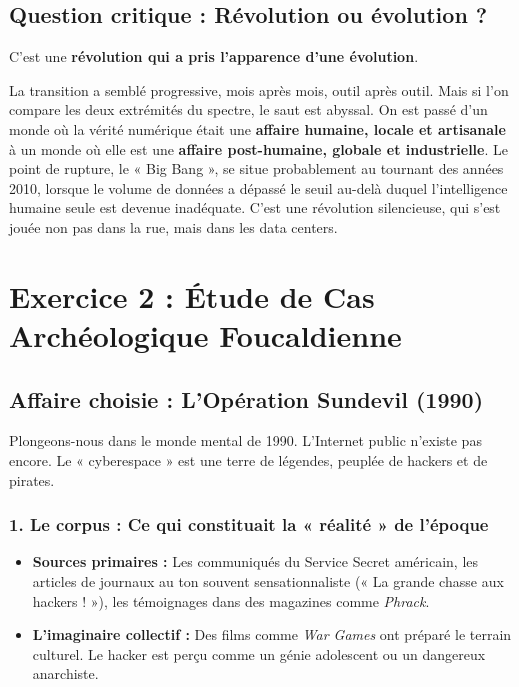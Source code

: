 \documentclass[12pt]{article}
\begin{document}
\subsection{Question critique : Révolution ou évolution ?}

C'est une \textbf{révolution qui a pris l'apparence d'une évolution}.

La transition a semblé progressive, mois après mois, outil après outil. Mais si l'on compare les deux extrémités du spectre, le saut est abyssal. On est passé d'un monde où la vérité numérique était une \textbf{affaire humaine, locale et artisanale} à un monde où elle est une \textbf{affaire post-humaine, globale et industrielle}. Le point de rupture, le « Big Bang », se situe probablement au tournant des années 2010, lorsque le volume de données a dépassé le seuil au-delà duquel l'intelligence humaine seule est devenue inadéquate. C'est une révolution silencieuse, qui s'est jouée non pas dans la rue, mais dans les data centers.

\section*{Exercice 2 : Étude de Cas Archéologique Foucaldienne}

\subsection{Affaire choisie : L'Opération Sundevil (1990)}

Plongeons-nous dans le monde mental de 1990. L'Internet public n'existe pas encore. Le « cyberespace » est une terre de légendes, peuplée de hackers et de pirates.

\subsubsection{1. Le corpus : Ce qui constituait la « réalité » de l'époque}

\begin{itemize}
\item \textbf{Sources primaires :} Les communiqués du Service Secret américain, les articles de journaux au ton souvent sensationnaliste (« La grande chasse aux hackers ! »), les témoignages dans des magazines comme \emph{Phrack}.
\item \textbf{L'imaginaire collectif :} Des films comme \emph{War Games} ont préparé le terrain culturel. Le hacker est perçu comme un génie adolescent ou un dangereux anarchiste.
\end{itemize}
\end{document}
